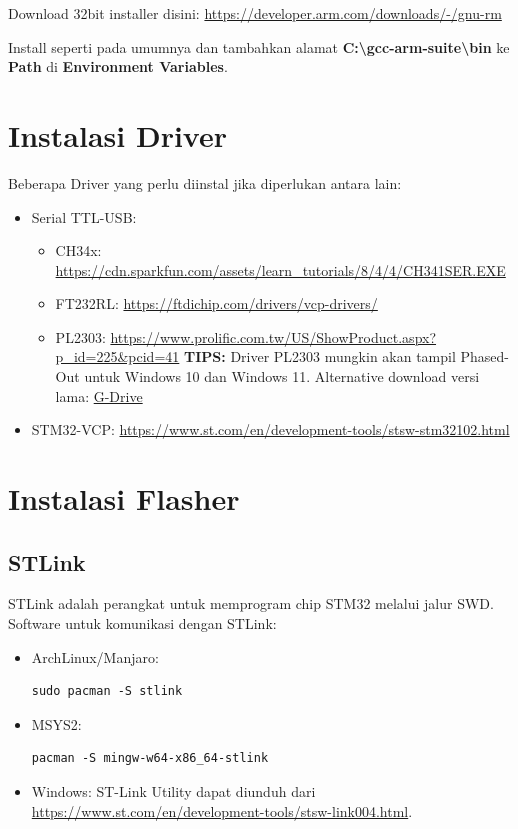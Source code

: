 \documentclass[12pt]{book}
\begin{document}
	Download 32bit installer disini: \url{https://developer.arm.com/downloads/-/gnu-rm}
	
	Install seperti pada umumnya dan tambahkan alamat \textbf{C:\textbackslash gcc-arm-suite\textbackslash bin} ke \textbf{Path} di \textbf{Environment Variables}.
	
	\section{Instalasi Driver}
	
	Beberapa Driver yang perlu diinstal jika diperlukan antara lain:
	
	\begin{itemize}
		\item Serial TTL-USB:
		\begin{itemize}
			\item CH34x: \url{https://cdn.sparkfun.com/assets/learn_tutorials/8/4/4/CH341SER.EXE}
			\item FT232RL: \url{https://ftdichip.com/drivers/vcp-drivers/}
			\item PL2303: \url{https://www.prolific.com.tw/US/ShowProduct.aspx?p_id=225&pcid=41}
			\textbf{TIPS:} Driver PL2303 mungkin akan tampil Phased-Out untuk Windows 10 dan Windows 11.
			Alternative download versi lama: \href{https://drive.google.com/file/d/11ivvhc-s3gQD2uzF0HDYm6e5w_w103FT/view}{G-Drive}
		\end{itemize}
		
		\item STM32-VCP: \url{https://www.st.com/en/development-tools/stsw-stm32102.html}
	\end{itemize}
	
	\section{Instalasi Flasher}
	
	\subsection{STLink}
	
	STLink adalah perangkat untuk memprogram chip STM32 melalui jalur SWD.	
	Software untuk komunikasi dengan STLink:
	
	\begin{itemize}
		\item ArchLinux/Manjaro:
		\begin{verbatim}
sudo pacman -S stlink
		\end{verbatim}
		
		\item MSYS2:
		\begin{verbatim}
pacman -S mingw-w64-x86_64-stlink
		\end{verbatim}
		
		\item Windows: ST-Link Utility dapat diunduh dari \url{https://www.st.com/en/development-tools/stsw-link004.html}.
	\end{itemize}
	
\end{document}
